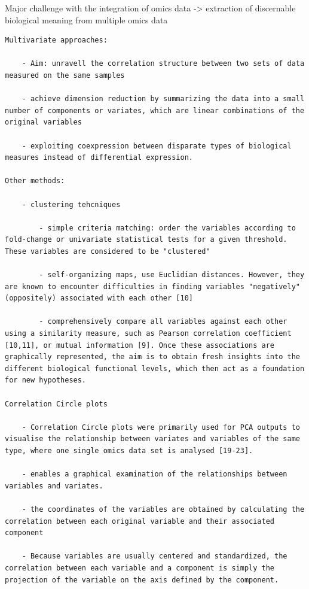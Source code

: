 \documentclass[
]{book}
\begin{document}
Major challenge with the integration of omics data -\textgreater{} extraction of discernable biological meaning from multiple omics data

\begin{verbatim}
Multivariate approaches:

    - Aim: unravell the correlation structure between two sets of data measured on the same samples

    - achieve dimension reduction by summarizing the data into a small number of components or variates, which are linear combinations of the original variables

    - exploiting coexpression between disparate types of biological measures instead of differential expression.

Other methods:

    - clustering tehcniques

        - simple criteria matching: order the variables according to fold-change or univariate statistical tests for a given threshold. These variables are considered to be "clustered"

        - self-organizing maps, use Euclidian distances. However, they are known to encounter difficulties in finding variables "negatively" (oppositely) associated with each other [10]

        - comprehensively compare all variables against each other using a similarity measure, such as Pearson correlation coefficient [10,11], or mutual information [9]. Once these associations are graphically represented, the aim is to obtain fresh insights into the different biological functional levels, which then act as a foundation for new hypotheses.

Correlation Circle plots

    - Correlation Circle plots were primarily used for PCA outputs to visualise the relationship between variates and variables of the same type, where one single omics data set is analysed [19-23].

    - enables a graphical examination of the relationships between variables and variates.

    - the coordinates of the variables are obtained by calculating the correlation between each original variable and their associated component

    - Because variables are usually centered and standardized, the correlation between each variable and a component is simply the projection of the variable on the axis defined by the component.


\end{verbatim}
\end{document}
